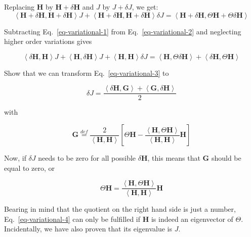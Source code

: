 Replacing ${\mathbf H}$ by ${\mathbf H} + \delta {\mathbf H}$ and $J$ by $J+ \delta J$, we get:
\begin{equation}
\left\langle {\mathbf H+\delta {\mathbf H}},{\mathbf H}+\delta {\mathbf H} \right\rangle J + \left\langle {\mathbf H}+\delta {\mathbf H},{\mathbf H+\delta {\mathbf H}} \right\rangle \delta  J= \left\langle {\mathbf H}+\delta {\mathbf H},\Theta {\mathbf H} + \Theta \delta {\mathbf H} \right\rangle \label{eq-variational-2}
\end{equation} 

Subtracting Eq.~\ref{eq-variational-1} from Eq.~\ref{eq-variational-2} and neglecting higher order variations gives

\begin{equation}
\left\langle \delta {\mathbf H},{\mathbf H} \right\rangle J + \left\langle {\mathbf H},\delta {\mathbf H} \right\rangle J + \left\langle {\mathbf H}, {\mathbf H} \right\rangle \delta J = \left\langle {\mathbf H},\Theta \delta {\mathbf H} \right\rangle + \left\langle \delta {\mathbf H},\Theta {\mathbf H} \right\rangle \label{eq-variational-3}
\end{equation} 


\begin{exer}
Show that we can transform Eq.~\ref{eq-variational-3} to

$$\delta J = \frac {\left\langle \delta {\mathbf H} , {\mathbf G} \right\rangle + \left\langle {\mathbf G} , \delta {\mathbf H} \right\rangle}{2}$$

with

$${\mathbf G} \stackrel{def}{=} \frac{2}{\left\langle {\mathbf H} , {\mathbf H}\right\rangle } \left[ \Theta {\mathbf H} - \frac{\left\langle {\mathbf H} , \Theta {\mathbf H}\right\rangle}{\left\langle {\mathbf H} , {\mathbf H}\right\rangle} {\mathbf H} \right]  $$
\end{exer}


Now, if $\delta J$ needs to be zero for all possible ${\delta \mathbf H}$, this means that ${\mathbf G}$ should be equal to zero, or

\begin{equation}
\Theta {\mathbf H} = \frac{\left\langle {\mathbf H} , \Theta {\mathbf H}\right\rangle}{\left\langle {\mathbf H} , {\mathbf H}\right\rangle} {\mathbf H} \label{eq-variational-4}
\end{equation} 

Bearing in mind that the quotient on the right hand side is just a number, Eq.~\ref{eq-variational-4} can only be fulfilled if ${\mathbf H}$ is indeed an eigenvector of $\Theta$. Incidentally, we have also proven that its eigenvalue is $J$.

